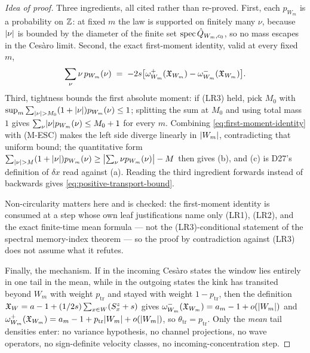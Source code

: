 \begin{proof}[Idea of proof]
Three ingredients, all cited rather than re-proved. First, each $p_{W_m}$ is a
probability on $\mathbb{Z}$: at fixed $m$ the law is supported on finitely many $\nu$,
because $\lvert \nu\rvert$ is bounded by the diameter of the finite set
$\operatorname{spec}\hat{Q}_{W_m,c_0}$, so no mass escapes in the Ces\`aro limit. Second, the
exact first-moment identity, valid at every fixed $m$,
\begin{equation}
  \sum_\nu\nu\,p_{W_m}(\nu)
  \;=\;-2s\bigl[\omega^+_{W_m}(\mathfrak{X}_{W_m})
  -\omega^-_{W_m}(\mathfrak{X}_{W_m})\bigr].
  \label{eq:first-moment-identity}
\end{equation}
Third, tightness bounds the first absolute moment: if (LR3) held, pick $M_0$
with $\sup_m\sum_{\lvert \nu\rvert>M_0}(1+\lvert \nu\rvert)p_{W_m}(\nu)\le1$; splitting the
sum at $M_0$ and using total mass $1$ gives
$\sum_\nu\lvert \nu\rvert p_{W_m}(\nu)\le M_0+1$ for every $m$. Combining
\eqref{eq:first-moment-identity} with (M-ESC) makes the left side diverge
linearly in $\lvert W_m\rvert$, contradicting that uniform bound; the quantitative
form
$\sum_{\lvert \nu\rvert>M}(1+\lvert \nu\rvert)p_{W_m}(\nu)\ge
\bigl|\sum_\nu\nu p_{W_m}(\nu)\bigr|-M$ then gives (b), and (c) is D27's
definition of $\delta x$ read against (a). Reading the third ingredient
forwards instead of backwards gives \eqref{eq:positive-transport-bound}.

Non-circularity matters here and is checked: the first-moment identity is
consumed at a step whose own leaf justifications name only (LR1), (LR2), and
the exact finite-time mean formula --- not the (LR3)-conditional statement of
the spectral memory-index theorem --- so the proof by contradiction against
(LR3) does not assume what it refutes.

Finally, the mechanism. If in the incoming Ces\`aro states the window lies
entirely in one tail in the mean, while in the outgoing states the kink has
transited beyond $W_m$ with weight $p_{\mathrm{tr}}$ and stayed with weight
$1-p_{\mathrm{tr}}$, then the definition
$\mathfrak{X}_W=a-1+(1/2s)\sum_{x\in W}(S^z_x+s)$ gives
$\omega^-_{W_m}(\mathfrak{X}_{W_m})=a_m-1+o(\lvert W_m\rvert)$ and
$\omega^+_{W_m}(\mathfrak{X}_{W_m})=a_m-1+p_{\mathrm{tr}}\lvert W_m\rvert+o(\lvert W_m\rvert)$, so
$\theta_{\mathrm{tr}}=p_{\mathrm{tr}}$. Only the \emph{mean} tail densities
enter: no variance hypothesis, no channel projections, no wave operators, no
sign-definite velocity classes, no incoming-concentration step.
\end{proof}

